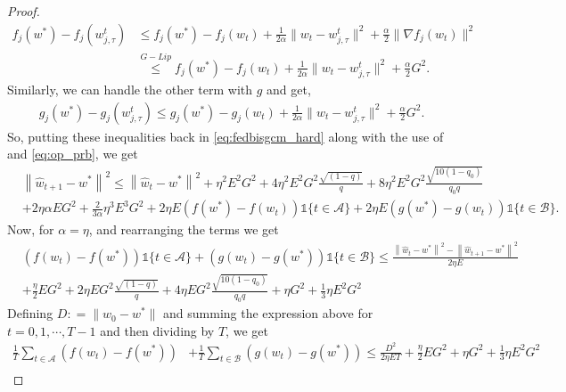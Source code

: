 \documentclass{article} %
\def\A{{\mathcal A}}
\def\B{{\mathcal B}}
\begin{document}
\begin{proof}
\begin{align*}
f_j(w^*) - f_j(w_{j,\tau}^t)
&\leq f_j(w^*) - f_j(w_t) + \frac{1}{2\alpha} \| w_t - w_{j,\tau}^t \|^2 + \frac{\alpha}{2} \| \nabla f_j(w_t) \|^2
\\
&\overset{G-Lip}{\leq}f_j(w^*) - f_j(w_t) + \frac{1}{2\alpha} \| w_t - w_{j,\tau}^t \|^2 + \frac{\alpha}{2}G^2.
\end{align*}
Similarly, we can handle the other term with $g$ and get,
\begin{align*}
g_j(w^*) - g_j(w_{j,\tau}^t)\leq g_j(w^*) - g_j(w_t) + \frac{1}{2\alpha} \| w_t - w_{j,\tau}^t \|^2 + \frac{\alpha}{2}G^2.
\end{align*}
So, putting these inequalities back in \cref{eq:fedbisgcm_hard} along with the use of  and \cref{eq:op_prb}, we get
\begin{equation*}
    \begin{aligned}
        &\left\| \hat{w}_{t+1} - w^* \right\|^2 \leq \left\| \hat{w}_t - w^* \right\|^2 + \eta^2E^2G^2  + 4\eta^2E^2G^2\frac{\sqrt{(1-q)}}{q} + 8\eta^2 E^2 G^2 \frac{\sqrt{10(1-q_0)}}{q_0q}
        \\
        & + 2\eta \alpha E G^2 + \frac{2}{3\alpha}\eta^3E^3G^2 
        + 2\eta E (f(w^*) - f(w_t))\mathds{1}\{t \in \A\} + 2\eta E (g(w^*) - g(w_t))\mathds{1}\{t \in \B\}.
    \end{aligned}
\end{equation*}
Now, for $\alpha = \eta$, and rearranging the terms we get
\begin{equation*}
    \begin{aligned}
        &(f(w_t) - f(w^*) )\mathds{1}\{t \in \A\} + (g(w_t) - g(w^*))\mathds{1}\{t \in \B\} \leq \frac{\left\| \hat{w}_t - w^* \right\|^2 - \left\| \hat{w}_{t+1} - w^* \right\|^2}{2\eta E}
        \\
        &+ \frac{\eta}{2} E G^2  + 2\eta E G^2\frac{\sqrt{(1-q)}}{q} + 4 \eta E G^2 \frac{\sqrt{10(1-q_0)}}{q_0q} + \eta G^2 + \frac{1}{3}\eta E^2 G^2
    \end{aligned}
\end{equation*}
Defining $D: = \|w_0 - w^*\|$ and summing the expression above for $t = 0,1, \cdots, T-1$ and then dividing by $T$, we get
\begin{equation*}
    \begin{aligned}
        \frac{1}{T}\sum_{t\in \A}(f(w_t) - f(w^*) ) &+ \frac{1}{T}\sum_{t\in \B}(g(w_t) - g(w^*)) \leq \frac{D^2}{2\eta E T} + \frac{\eta}{2} E G^2 + \eta G^2 
        + \frac{1}{3}\eta E^2G^2 
        \\

\end{aligned}
\end{equation*}
\end{proof}
\end{document}
